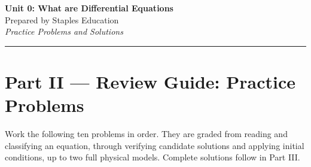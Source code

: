 \documentclass[11pt]{article}
\begin{document}
\begin{center}
    {\LARGE \bfseries Unit 0: What are Differential Equations}\\[6pt]
    {\large Prepared by Staples Education}\\[4pt]
    {\itshape Practice Problems and Solutions}
\end{center}

\vspace{0.6em}
\hrule
\vspace{0.6em}

\section*{Part II --- Review Guide: Practice Problems}

Work the following ten problems in order. They are graded from reading and
classifying an equation, through verifying candidate solutions and applying
initial conditions, up to two full physical models. Complete solutions follow
in Part III.
\end{document}
